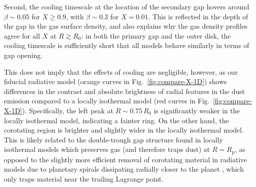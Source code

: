 \documentclass[fleqn,usenatbib,useAMS]{mnras}
\newcommand{\Rp}{R_\mathrm{p}}
\begin{document}
Second, the cooling timescale at the location of the secondary gap hovers around $\beta\sim0.05$ for $X\geq0.9$, with $\beta\sim0.3$ for $X=0.01$. This is reflected in the depth of the gap in the gas surface density, and also explains why the gas density profiles agree for all $X$ at $R\gtrsim R_0$: in both the primary gap and the outer disk, the cooling timescale is sufficiently short that all models behave similarly in terms of gap opening.

This does not imply that the effects of cooling are negligible, however, as our fiducial radiative model (orange curves in Fig.~\ref{fig:compare-X-1D}) shows differences in the contrast and absolute brightness of radial features in the dust emission compared to a locally isothermal model (red curves in Fig.~\ref{fig:compare-X-1D}). Specifically, the left peak at $R\sim0.75\,R_0$ is significantly weaker in the locally isothermal model, indicating a fainter ring. On the other hand, the corotating region is brighter and slightly wider in the locally isothermal model. This is likely related to the double-trough gap structure found in locally isothermal models \citep[e.g.,][]{cordwell-rafikov-2024} which preserves gas (and therefore traps dust) at $R=\Rp$, as opposed to the slightly more efficient removal of corotating material in radiative models due to planetary spirals dissipating radially closer to the planet \citep{miranda-rafikov-2020a}, which only traps material near the trailing Lagrange point.
\end{document}
